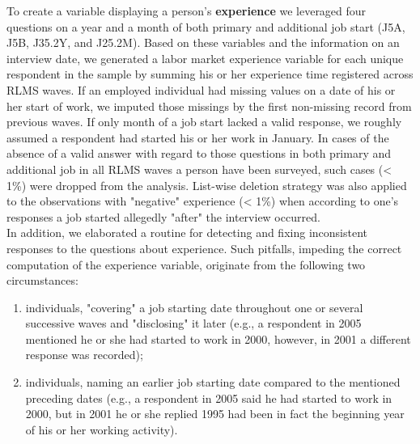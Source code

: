 \documentclass[12pt,a4paper]{article}
\begin{document}
To create a variable displaying a person's {\bf experience} we leveraged four questions on a year and a month of both primary and additional job start (J5A, J5B, J35.2Y, and J25.2M). Based on these variables and the information on an interview date, we generated a labor market experience variable for each unique respondent in the sample by summing his or her experience time registered across RLMS waves. If an employed individual had missing values on a date of his or her start of work, we imputed those missings by the first non-missing record from previous waves. If only month of a job start lacked a valid response, we roughly assumed a respondent had started his or her work in January. In cases of the absence of a valid answer with regard to those questions in both primary and additional job in all RLMS waves a person have been surveyed, such cases (< 1\%) were dropped from the analysis. List-wise deletion strategy was also applied to the observations with "negative" experience (< 1\%) when according to one's responses a job started allegedly "after" the interview occurred.
\\

In addition, we elaborated a routine for detecting and fixing inconsistent responses to the questions about experience. Such pitfalls, impeding the correct computation of the experience variable, originate from the following two circumstances:

\begin{enumerate}
\item individuals, "covering" a job starting date throughout one or several successive waves and "disclosing" it later (e.g., a respondent in 2005 mentioned he or she had started to work in 2000, however, in 2001 a different response was recorded); 

\item individuals, naming an earlier job starting date compared to the mentioned preceding dates (e.g., a respondent in 2005 said he had started to work in 2000, but in 2001 he or she replied 1995 had been in fact the beginning year of his or her working activity). 
\end{enumerate}
\end{document}
